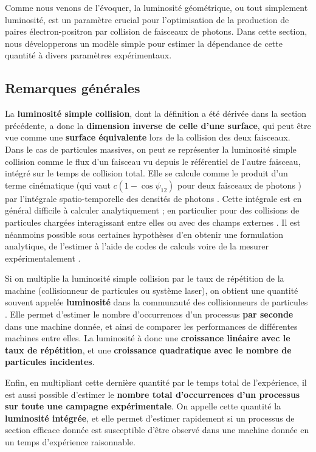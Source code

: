 \begin{refsection}
Comme nous venons de l'évoquer, la luminosité géométrique, ou tout simplement luminosité, est un paramètre crucial pour l'optimisation de la production de paires électron-positron par collision de faisceaux de photons. Dans cette section, nous développerons un modèle simple pour estimer la dépendance de cette quantité à divers paramètres expérimentaux.

\subsection{Remarques générales}

La \textbf{luminosité simple collision}, dont la définition a été dérivée dans la section précédente, a donc la \textbf{dimension inverse de celle d'une surface}, qui peut être vue comme une \textbf{surface équivalente} lors de la collision des deux faisceaux. Dans le cas de particules massives, on peut se représenter la luminosité simple collision comme le flux d'un faisceau vu depuis le référentiel de l'autre faisceau, intégré sur le temps de collision total. Elle se calcule comme le produit d'un terme cinématique (qui vaut $c (1 -\cos{\psi_{12}})$ pour deux faisceaux de photons \parencite{gould_1971}) par l'intégrale spatio-temporelle des densités de photons \parencite{herr_2006}. Cette intégrale est en général difficile à calculer analytiquement \parencite{meshkov_2018} ; en particulier pour des collisions de particules chargées interagissant entre elles ou avec des champs externes \parencite{herr_2006}. Il est néanmoins possible sous certaines hypothèses d'en obtenir une formulation analytique, de l'estimer à l'aide de codes de calculs voire de la mesurer expérimentalement \parencite{herr_2006}.

Si on multiplie la luminosité simple collision par le taux de répétition de la machine (collisionneur de particules ou système laser), on obtient une quantité souvent appelée \textbf{luminosité} dans la communauté des collisionneurs de particules \parencite{herr_2006}. Elle permet d'estimer le nombre d’occurrences d'un processus \textbf{par seconde} dans une machine donnée, et ainsi de comparer les performances de différentes machines entre elles. La luminosité à donc une \textbf{croissance linéaire avec le taux de répétition}, et une \textbf{croissance quadratique avec le nombre de particules incidentes}.

Enfin, en multipliant cette dernière quantité par le temps total de l'expérience, il est aussi possible d'estimer le \textbf{nombre total d’occurrences d'un processus sur toute une campagne expérimentale}. On appelle cette quantité la \textbf{luminosité intégrée}, et elle permet d'estimer rapidement si un processus de section efficace donnée est susceptible d'être observé dans une machine donnée en un temps d'expérience raisonnable. 


\end{refsection}
